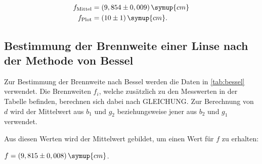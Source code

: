 \begin{align*}
    f_\text{Mittel} &= (9,854 \pm 0,009) \, \symup{cm}\\
    f_\text{Plot} &= (10 \pm 1) \, \symup{cm}.
\end{align*}



\subsection{Bestimmung der Brennweite einer Linse nach der Methode von Bessel}

Zur Bestimmung der Brennweite nach Bessel werden die Daten in \autoref{tab:bessel} verwendet.
Die Brennweiten $f_i$, welche zusätzlich zu den Messwerten in der Tabelle befinden, berechnen sich dabei nach GLEICHUNG.
Zur Berechnung von $d$ wird der Mittelwert aus $b_1$ und $g_2$ beziehungsweise jener aus $b_2$ und $g_1$ verwendet.



Aus diesen Werten wird der Mittelwert gebildet, um einen Wert für $f$ zu erhalten:

\begin{center}
  $f = (9,815 \pm 0,008) \, \symup{cm}$.
\end{center}